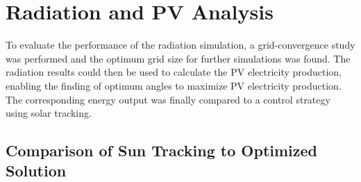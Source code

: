 	
\section{Radiation and PV Analysis}

	
	To evaluate the performance of the radiation simulation, a grid-convergence study was performed and the optimum grid size for further simulations was found. The radiation results could then be used to calculate the PV electricity production, enabling the finding of optimum angles to maximize PV electricity production. The corresponding energy output was finally compared to a control strategy using solar tracking.




	\subsection{Comparison of Sun Tracking to Optimized Solution}
	\label{ss:compareSunTracking}

